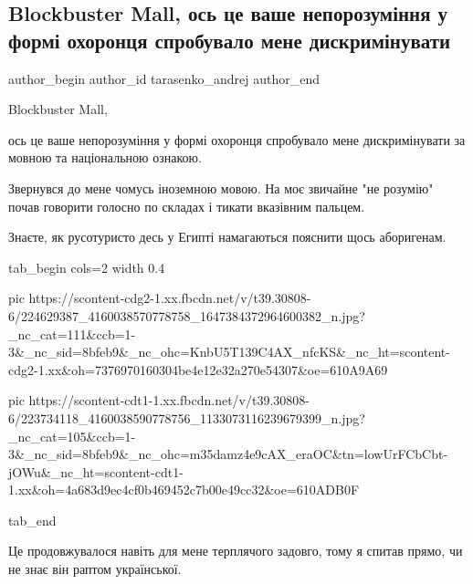  
 
 
 
 
 
\subsection{Blockbuster Mall, ось це ваше непорозуміння у формі охоронця спробувало мене дискримінувати}
\label{sec:31_07_2021.fb.tarasenko_andrej.1.diskriminacia_blockbuster_mall}
 
\ifcmt
 author_begin
   author_id tarasenko_andrej
 author_end
\fi

Blockbuster Mall, 

ось це ваше непорозуміння у формі охоронця спробувало мене дискримінувати за
мовною та національною ознакою. 

Звернувся до мене чомусь іноземною мовою. На моє звичайне "не розумію" почав
говорити голосно по складах і тикати вказівним пальцем. 

Знаєте, як русотуристо десь у Египті намагаються пояснити щось аборигенам. 

\ifcmt
  tab_begin cols=2
		 width 0.4

     pic https://scontent-cdg2-1.xx.fbcdn.net/v/t39.30808-6/224629387_4160038570778758_1647384372964600382_n.jpg?_nc_cat=111&ccb=1-3&_nc_sid=8bfeb9&_nc_ohc=KnbU5T139C4AX_nfcKS&_nc_ht=scontent-cdg2-1.xx&oh=7376970160304be4e12e32a270e54307&oe=610A9A69

     pic https://scontent-cdt1-1.xx.fbcdn.net/v/t39.30808-6/223734118_4160038590778756_1133073116239679399_n.jpg?_nc_cat=105&ccb=1-3&_nc_sid=8bfeb9&_nc_ohc=m35damz4e9cAX_eraOC&tn=lowUrFCbCbt-jOWu&_nc_ht=scontent-cdt1-1.xx&oh=4a683d9ec4cf0b469452c7b00e49cc32&oe=610ADB0F

  tab_end
\fi


Це продовжувалося навіть для мене терплячого задовго, тому я спитав прямо, чи
не знає він раптом української. 

